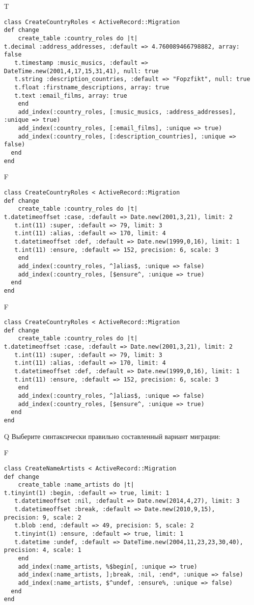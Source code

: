 T
\begin{verbatim}
class CreateCountryRoles < ActiveRecord::Migration
def change
	create_table :country_roles do |t|
t.decimal :address_addresses, :default => 4.760089466798882, array: false
   t.timestamp :music_musics, :default => DateTime.new(2001,4,17,15,31,41), null: true
   t.string :description_countries, :default => "Fopzfikt", null: true
   t.float :firstname_descriptions, array: true
   t.text :email_films, array: true
   	end
	add_index(:country_roles, [:music_musics, :address_addresses], :unique => true)
	add_index(:country_roles, [:email_films], :unique => true)
	add_index(:country_roles, [:description_countries], :unique => false)
  end 
end

\end{verbatim}

F
\begin{verbatim}
class CreateCountryRoles < ActiveRecord::Migration
def change
	create_table :country_roles do |t|
t.datetimeoffset :case, :default => Date.new(2001,3,21), limit: 2
   t.int(11) :super, :default => 79, limit: 3
   t.int(11) :alias, :default => 170, limit: 4
   t.datetimeoffset :def, :default => Date.new(1999,0,16), limit: 1
   t.int(11) :ensure, :default => 152, precision: 6, scale: 3
   	end
	add_index(:country_roles, ^]alias$, :unique => false)
	add_index(:country_roles, [$ensure^, :unique => true)
  end 
end

\end{verbatim}

F
\begin{verbatim}
class CreateCountryRoles < ActiveRecord::Migration
def change
	create_table :country_roles do |t|
t.datetimeoffset :case, :default => Date.new(2001,3,21), limit: 2
   t.int(11) :super, :default => 79, limit: 3
   t.int(11) :alias, :default => 170, limit: 4
   t.datetimeoffset :def, :default => Date.new(1999,0,16), limit: 1
   t.int(11) :ensure, :default => 152, precision: 6, scale: 3
   	end
	add_index(:country_roles, ^]alias$, :unique => false)
	add_index(:country_roles, [$ensure^, :unique => true)
  end 
end

\end{verbatim}

Q
Выберите синтаксически правильно составленный вариант миграции:

F
\begin{verbatim}
class CreateNameArtists < ActiveRecord::Migration
def change
	create_table :name_artists do |t|
t.tinyint(1) :begin, :default => true, limit: 1
   t.datetimeoffset :nil, :default => Date.new(2014,4,27), limit: 3
   t.datetimeoffset :break, :default => Date.new(2010,9,15), precision: 9, scale: 2
   t.blob :end, :default => 49, precision: 5, scale: 2
   t.tinyint(1) :ensure, :default => true, limit: 1
   t.datetime :undef, :default => DateTime.new(2004,11,23,23,30,40), precision: 4, scale: 1
   	end
	add_index(:name_artists, %$begin[, :unique => true)
	add_index(:name_artists, ];break, :nil, :end*, :unique => false)
	add_index(:name_artists, $^undef, :ensure%, :unique => false)
  end 
end

\end{verbatim}

